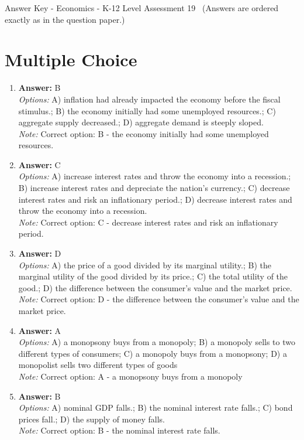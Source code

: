\documentclass[12pt]{article}
\begin{document}
\begin{center}
Answer Key - Economics - K-12 Level Assessment 19 \
\small (Answers are ordered exactly as in the question paper.)
\end{center}

\section*{Multiple Choice}
\begin{enumerate}[label=\arabic*.]
\item \textbf{Answer:} B
\\ \textit{Options:} A) inflation had already impacted the economy before the fiscal stimulus.; B) the economy initially had some unemployed resources.; C) aggregate supply decreased.; D) aggregate demand is steeply sloped.
\\ \textit{Note:} Correct option: B - the economy initially had some unemployed resources.
\item \textbf{Answer:} C
\\ \textit{Options:} A) increase interest rates and throw the economy into a recession.; B) increase interest rates and depreciate the nation's currency.; C) decrease interest rates and risk an inflationary period.; D) decrease interest rates and throw the economy into a recession.
\\ \textit{Note:} Correct option: C - decrease interest rates and risk an inflationary period.
\item \textbf{Answer:} D
\\ \textit{Options:} A) the price of a good divided by its marginal utility.; B) the marginal utility of the good divided by its price.; C) the total utility of the good.; D) the difference between the consumer's value and the market price.
\\ \textit{Note:} Correct option: D - the difference between the consumer's value and the market price.
\item \textbf{Answer:} A
\\ \textit{Options:} A) a monopsony buys from a monopoly; B) a monopoly sells to two different types of consumers; C) a monopoly buys from a monopsony; D) a monopolist sells two different types of goods
\\ \textit{Note:} Correct option: A - a monopsony buys from a monopoly
\item \textbf{Answer:} B
\\ \textit{Options:} A) nominal GDP falls.; B) the nominal interest rate falls.; C) bond prices fall.; D) the supply of money falls.
\\ \textit{Note:} Correct option: B - the nominal interest rate falls.
\end{enumerate}
\end{document}
